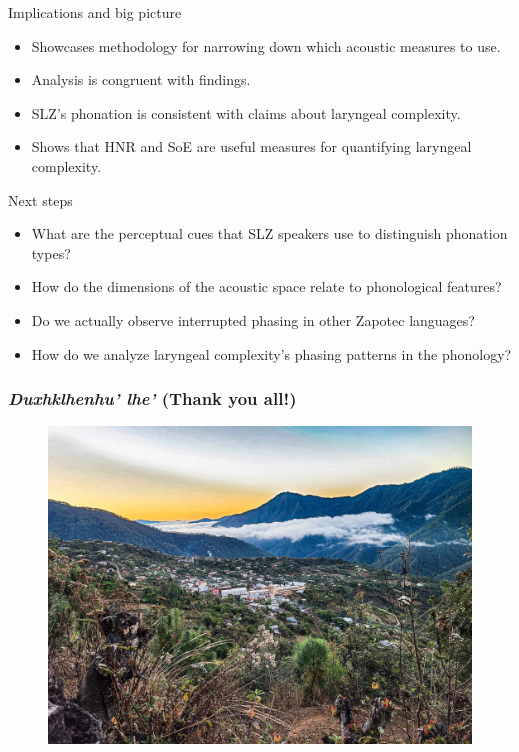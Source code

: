\documentclass[professionalfonts]{beamer}
\begin{document}
\begin{frame}{Implications and big picture}
  \begin{itemize}
    \item Showcases  methodology for narrowing down which acoustic measures to use.
    \item Analysis is congruent with  findings.
    \item SLZ's phonation is consistent with  claims about laryngeal complexity.
    \item Shows that HNR and SoE are useful measures for quantifying laryngeal complexity.
  \end{itemize}
\end{frame}

\begin{frame}{Next steps}  
  \begin{itemize}
    \item What are the perceptual cues that SLZ speakers use to distinguish phonation types?
    \item How do the dimensions of the acoustic space relate to phonological features?
    \item Do we actually observe interrupted phasing in other Zapotec languages?
    \item How do we analyze laryngeal complexity's phasing patterns in the phonology?
  \end{itemize}
\end{frame}

\begin{frame}
  \frametitle{\textit{Duxhklhenhu' lhe'} (Thank you all!)}
  \begin{figure}
    \centering
    \includegraphics[width = \linewidth]{images/SantiagoLaxopa.jpeg}
  \end{figure}
\end{frame}
\end{document}
